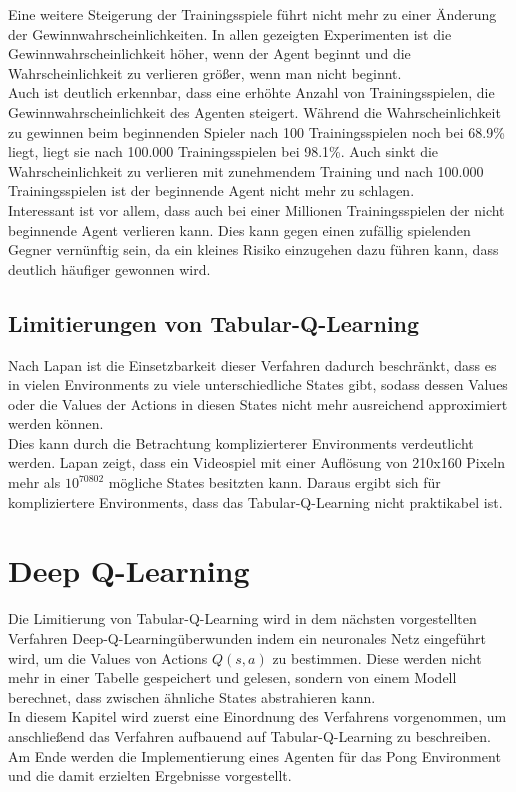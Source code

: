 \documentclass[11pt]{scrartcl}
\begin{document}
\noindent
Eine weitere Steigerung der Trainingsspiele führt nicht mehr zu einer Änderung der
Gewinnwahrscheinlichkeiten. In allen gezeigten Experimenten ist die
Gewinnwahrscheinlichkeit höher, wenn der Agent beginnt und die Wahrscheinlichkeit zu
verlieren größer, wenn man nicht beginnt.\\
Auch ist deutlich erkennbar, dass eine erhöhte Anzahl von Trainingsspielen, die
Gewinnwahrscheinlichkeit des Agenten steigert. Während die Wahrscheinlichkeit zu gewinnen
beim beginnenden Spieler nach 100 Trainingsspielen noch bei 68.9\% liegt, liegt sie nach
100.000 Trainingsspielen bei 98.1\%. Auch sinkt die Wahrscheinlichkeit zu verlieren mit
zunehmendem Training und nach 100.000 Trainingsspielen ist der beginnende Agent nicht mehr
zu schlagen.\\
Interessant ist vor allem, dass auch bei einer Millionen Trainingsspielen der nicht
beginnende Agent verlieren kann. Dies kann gegen einen zufällig spielenden Gegner
vernünftig sein, da ein kleines Risiko einzugehen dazu führen kann, dass deutlich häufiger
gewonnen wird.


\subsection{Limitierungen von Tabular-Q-Learning}
Nach Lapan\cite[~S.192]{L2018} ist die Einsetzbarkeit dieser Verfahren dadurch
beschränkt, dass es in vielen Environments zu viele unterschiedliche States gibt, sodass
dessen Values oder die Values der Actions in diesen States nicht mehr ausreichend
approximiert werden können.\\
Dies kann durch die Betrachtung komplizierterer Environments verdeutlicht werden. Lapan
\cite[~S.192]{L2018} zeigt, dass ein Videospiel mit einer Auflösung von 210x160 Pixeln
mehr als $10^{70802}$ mögliche States besitzten kann. Daraus ergibt sich für
kompliziertere Environments, dass das Tabular-Q-Learning nicht praktikabel ist.

\newpage
\section{Deep Q-Learning}
\label{sec:dqn}
Die Limitierung von Tabular-Q-Learning wird in dem nächsten vorgestellten Verfahren \grqq
Deep-Q-Learning\grqq überwunden indem ein neuronales Netz eingeführt wird, um die Values
von Actions $Q(s, a)$ zu bestimmen. Diese werden nicht mehr in einer Tabelle gespeichert
und gelesen, sondern von einem Modell berechnet, dass zwischen ähnliche States
abstrahieren kann.\\
In diesem Kapitel wird zuerst eine Einordnung des Verfahrens vorgenommen, um anschließend
das Verfahren aufbauend auf Tabular-Q-Learning zu beschreiben. Am Ende werden die	
Implementierung eines Agenten für das Pong Environment und die damit erzielten Ergebnisse
vorgestellt.
\end{document}
